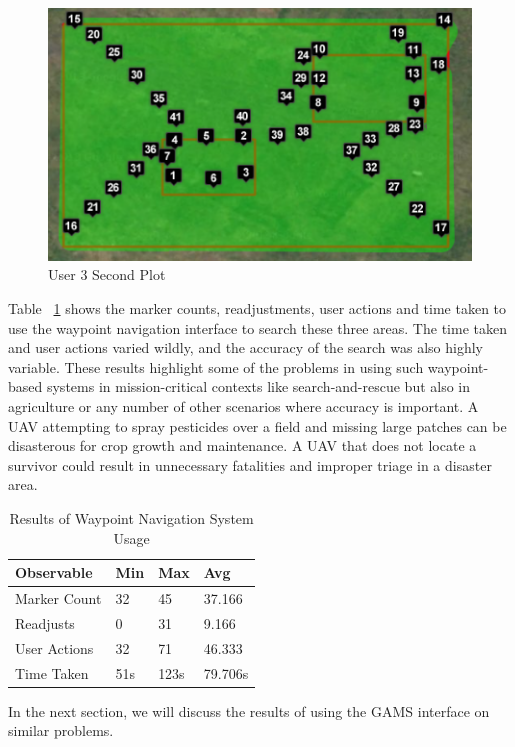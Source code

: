 \documentclass{sig-alternate-ipsn13}
\newcommand\T{\rule{0pt}{2.6ex}}
\newcommand\B{\rule[-1.2ex]{0pt}{0pt}}
\begin{document}
\begin{figure}[h]
  \centering
  \includegraphics[scale=0.45]{user_waypoints_6}
  \caption{User 3 Second Plot}
  \label{fig:user3_2}
\end{figure}

Table ~\ref{tab:averagewaypoints} shows the marker counts, readjustments,
user actions and time taken to use the waypoint navigation interface to search these
three areas. The time taken and user actions varied wildly, and the accuracy of the
search was also highly variable. These results highlight some of the problems in
using such waypoint-based systems in mission-critical contexts like
search-and-rescue but also in agriculture or any number of other scenarios where
accuracy is important. A
UAV attempting to spray pesticides over a field and missing large patches can
be disasterous for crop growth and maintenance. A UAV that does not locate a
survivor could result in unnecessary fatalities and improper triage in a disaster
area. 

\begin{table}[htb]
\caption{Results of Waypoint Navigation System Usage}
\label{tab:averagewaypoints}
\centering
\begin{tabular}{|l|l|l|l|}
\hline

Observable \T & Min & Max & Avg \\
\hline Marker Count \T & 32 & 45 & 37.166 \\ 
Readjusts & 0 & 31 & 9.166 \\ 
User Actions & 32 & 71 & 46.333 \\ 
Time Taken \B & 51s  & 123s & 79.706s \\ \hline
\end{tabular}
\end{table}

In the next section, we will discuss the results of using the GAMS
interface on similar problems. 
\end{document}
